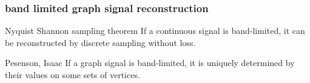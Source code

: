 \documentclass{beamer}
\begin{document}
\begin{frame}
\frametitle{band limited graph signal reconstruction}
\begin{block}{Nyquist Shannon sampling theorem}
If a continuous signal is band-limited, it can be reconstructed by discrete sampling without loss.
\end{block}
\begin{block}{Pesenson, Isaac}
If a graph signal is band-limited, it is uniquely determined by their values on some sets of vertices.
\end{block}
\end{frame}
\end{document}
